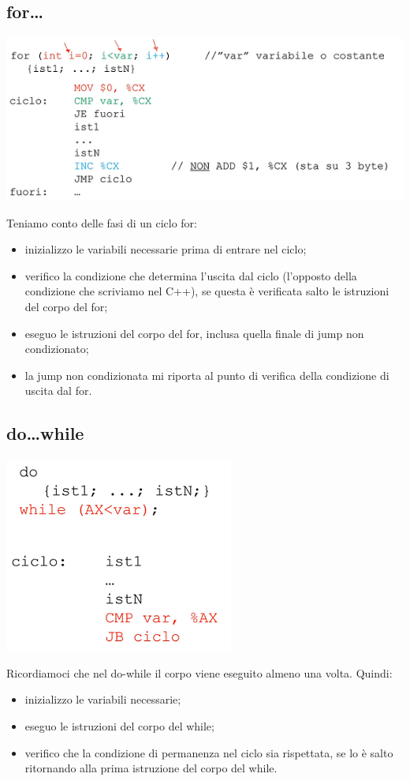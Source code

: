 \documentclass[11pt]{report}
\begin{document}
\subsection{for\dots}
\begin{center}
\includegraphics{img/51.PNG}
\end{center}
Teniamo conto delle fasi di un ciclo for:
\begin{itemize}
\item inizializzo le variabili necessarie prima di entrare nel ciclo;
\item verifico la condizione che determina l'uscita dal ciclo (l'opposto della condizione che scriviamo nel C++), se questa è verificata salto le istruzioni del corpo del for;
\item eseguo le istruzioni del corpo del for, inclusa quella finale di jump non condizionato;
\item la jump non condizionata mi riporta al punto di verifica della condizione di uscita dal for.
\end{itemize}
\subsection{do\dots while}
\begin{center}
\includegraphics{img/52.PNG}
\end{center}
Ricordiamoci che nel do-while il corpo viene eseguito almeno una volta. Quindi:
\begin{itemize}
\item inizializzo le variabili necessarie;
\item eseguo le istruzioni del corpo del while;
\item verifico che la condizione di permanenza nel ciclo sia rispettata, se lo è salto ritornando alla prima istruzione del corpo del while.
\end{itemize}
\end{document}
